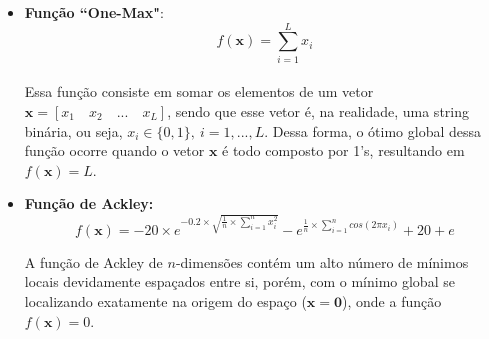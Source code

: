 \documentclass{report}
\begin{document}
	\begin{itemize}
		\item \textbf{Função ``One-Max"}:\\
		
		\begin{equation*}
		f(\mathbf{x}) = \sum_{i = 1}^{L} x_i
		\end{equation*}\\
		
		Essa função consiste em somar os elementos de um vetor $\mathbf{x} = [x_1 \quad x_2 \quad ... \quad x_L]$, sendo que esse vetor é, na realidade, uma string binária, ou seja, $x_i \in \{0, 1 \},\ i = 1, ..., L$. Dessa forma, o ótimo global dessa função ocorre quando o vetor $\mathbf{x}$ é todo composto por 1's, resultando em $f(\mathbf{x}) = L$.\\		
		
		\item \textbf{Função de Ackley:}\\
		
		\begin{equation*}
		f(\mathbf{x}) = -20 \times e^{-0.2 \times \sqrt{\frac{1}{n} \times \sum_{i = 1}^{n} x_i^2}} - e^{\frac{1}{n} \times \sum_{i = 1}^{n} cos(2\pi x_i)} + 20 + e
		\end{equation*}
		
		A função de Ackley de $n$-dimensões contém um alto número de mínimos locais devidamente espaçados entre si, porém, com o mínimo global se localizando exatamente na origem do espaço ($\mathbf{x} = \boldsymbol{0}$), onde a função $f(\mathbf{x}) = 0$.
		
	\end{itemize}
\end{document}
